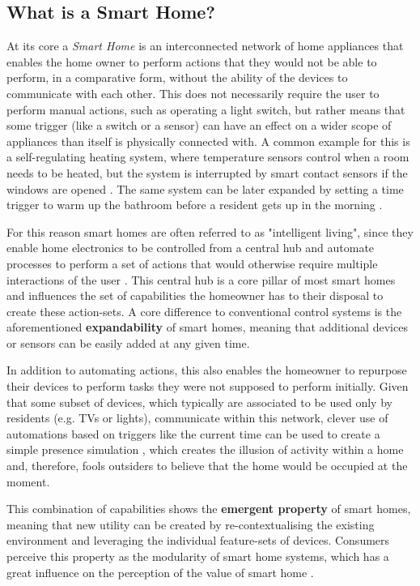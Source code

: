 \subsection{What is a Smart Home?}
At its core a \textit{Smart Home} is an interconnected network of home appliances that enables the home owner to perform actions that they would not be able to perform, in a comparative form, without the ability of the devices to communicate with each other. This does not necessarily require the user to perform manual actions, such as operating a light switch, but rather means that some trigger (like a switch or a sensor) can have an effect on a wider scope of appliances than itself is physically connected with. A common example for this is a self-regulating heating system, where temperature sensors control when a room needs to be heated, but the system is interrupted by smart contact sensors if the windows are opened \cite{BertkoChris2017HSH:}. The same system can be later expanded by setting a time trigger to warm up the bathroom before a resident gets up in the morning \cite{Tuohy2023SHP}.

For this reason smart homes are often referred to as "intelligent living"\cite{BertkoChris2017HSH:}, since they enable home electronics to be controlled from a central hub and automate processes to perform a set of actions that would otherwise require multiple interactions of the user \cite{BertkoChris2017HSH:}. This central hub is a core pillar of most smart homes and influences the set of capabilities the homeowner has to their disposal to create these action-sets. A core difference to conventional control systems is the aforementioned \textbf{expandability} of smart homes, meaning that additional devices or sensors can be easily added at any given time.

In addition to automating actions, this also enables the homeowner to repurpose their devices to perform tasks they were not supposed to perform initially. Given that some subset of devices, which typically are associated to be used only by residents (e.g. TVs or lights), communicate within this network, clever use of automations based on triggers like the current time can be used to create a simple presence simulation \cite{BertkoChris2017HSH:}, which creates the illusion of activity within a home and, therefore, fools outsiders to believe that the home would be occupied at the moment.

This combination of capabilities shows the \textbf{emergent property} of smart homes, meaning that new utility can be created by re-contextualising the existing environment and leveraging the individual feature-sets of devices. Consumers perceive this property as the modularity of smart home systems, which has a great influence on the perception of the value of smart home \cite{TangRuiyang2021SoPE}.


